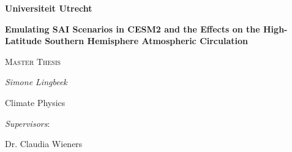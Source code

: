 
\begin{titlepage} %
	\noindent

    \par\vspace{1cm}
    \begin{flushright}
    {\LARGE\bfseries Universiteit Utrecht} %
    \end{flushright}
	\vspace{1cm}
    \begin{center}
    {\huge\bfseries Emulating SAI Scenarios in CESM2 and the Effects on the High-Latitude Southern Hemisphere Atmospheric Circulation\par} %
    \end{center}
	\vspace{1cm}
    {\scshape\Large Master Thesis\par}
	\vspace{0.5cm} %
	{\Large\itshape Simone Lingbeek\par}
    {\large Climate Physics\par}
    \vspace{7cm}
    \raggedleft
	{\Large\itshape Supervisors}:\par\vspace{0.25cm}
	{\large Dr. Claudia Wieners\par} %

\end{titlepage}
